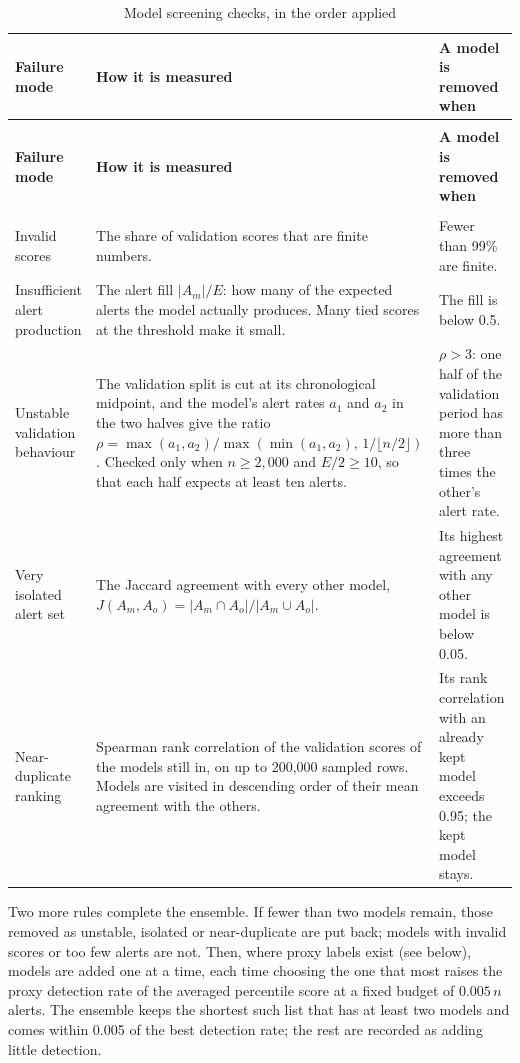 \documentclass[11pt,a4paper]{article}
\begin{document}
\begingroup
\small
\begin{longtable}{>{\RaggedRight\arraybackslash}p{}>{\RaggedRight\arraybackslash}p{}>{\RaggedRight\arraybackslash}p{}}
\caption{Model screening checks, in the order applied}\label{tab:screening}\\
\toprule
\rowcolor{pale} \textbf{Failure mode} & \textbf{How it is measured} & \textbf{A model is removed when} \\
\midrule
\endfirsthead
\multicolumn{3}{l}{\small\itshape Table \thetable{} --- continued}\\
\toprule
\rowcolor{pale} \textbf{Failure mode} & \textbf{How it is measured} & \textbf{A model is removed when} \\
\midrule
\endhead
\midrule
\multicolumn{3}{r}{\footnotesize Continued on the next page}\\
\endfoot
\bottomrule
\endlastfoot
Invalid scores & The share of validation scores that are finite numbers. & Fewer than 99\% are finite. \\[3pt]
Insufficient alert production & The alert fill \(|A_m|/E\): how many of the expected alerts the model actually produces. Many tied scores at the threshold make it small. & The fill is below 0.5. \\[3pt]
Unstable validation behaviour & The validation split is cut at its chronological midpoint, and the model's alert rates \(a_1\) and \(a_2\) in the two halves give the ratio \(\rho=\max(a_1,a_2)/\max(\min(a_1,a_2),\,1/\lfloor n/2\rfloor)\). Checked only when \(n\ge2{,}000\) and \(E/2\ge10\), so that each half expects at least ten alerts. & \(\rho>3\): one half of the validation period has more than three times the other's alert rate. \\[3pt]
Very isolated alert set & The Jaccard agreement with every other model, \(J(A_m,A_o)=|A_m\cap A_o|/|A_m\cup A_o|\). & Its highest agreement with any other model is below 0.05. \\[3pt]
Near-duplicate ranking & Spearman rank correlation of the validation scores of the models still in, on up to 200,000 sampled rows. Models are visited in descending order of their mean agreement with the others. & Its rank correlation with an already kept model exceeds 0.95; the kept model stays. \\[3pt]
\end{longtable}
\endgroup

Two more rules complete the ensemble. If fewer than two models remain, those removed as unstable, isolated or near-duplicate are put back; models with invalid scores or too few alerts are not. Then, where proxy labels exist (see below), models are added one at a time, each time choosing the one that most raises the proxy detection rate of the averaged percentile score at a fixed budget of \(0.005\,n\) alerts. The ensemble keeps the shortest such list that has at least two models and comes within 0.005 of the best detection rate; the rest are recorded as adding little detection.
\end{document}
